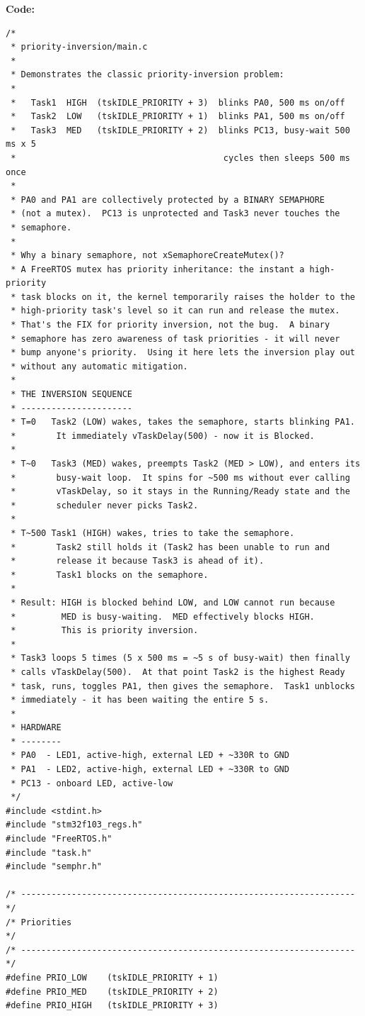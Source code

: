 ﻿\documentclass[12pt,a4paper]{article}
\begin{document}
\textbf{Code:}
\begin{lstlisting}
/*
 * priority-inversion/main.c
 *
 * Demonstrates the classic priority-inversion problem:
 *
 *   Task1  HIGH  (tskIDLE_PRIORITY + 3)  blinks PA0, 500 ms on/off
 *   Task2  LOW   (tskIDLE_PRIORITY + 1)  blinks PA1, 500 ms on/off
 *   Task3  MED   (tskIDLE_PRIORITY + 2)  blinks PC13, busy-wait 500 ms x 5
 *                                         cycles then sleeps 500 ms once
 *
 * PA0 and PA1 are collectively protected by a BINARY SEMAPHORE
 * (not a mutex).  PC13 is unprotected and Task3 never touches the
 * semaphore.
 *
 * Why a binary semaphore, not xSemaphoreCreateMutex()?
 * A FreeRTOS mutex has priority inheritance: the instant a high-priority
 * task blocks on it, the kernel temporarily raises the holder to the
 * high-priority task's level so it can run and release the mutex.
 * That's the FIX for priority inversion, not the bug.  A binary
 * semaphore has zero awareness of task priorities - it will never
 * bump anyone's priority.  Using it here lets the inversion play out
 * without any automatic mitigation.
 *
 * THE INVERSION SEQUENCE
 * ----------------------
 * T=0   Task2 (LOW) wakes, takes the semaphore, starts blinking PA1.
 *        It immediately vTaskDelay(500) - now it is Blocked.
 *
 * T~0   Task3 (MED) wakes, preempts Task2 (MED > LOW), and enters its
 *        busy-wait loop.  It spins for ~500 ms without ever calling
 *        vTaskDelay, so it stays in the Running/Ready state and the
 *        scheduler never picks Task2.
 *
 * T~500 Task1 (HIGH) wakes, tries to take the semaphore.
 *        Task2 still holds it (Task2 has been unable to run and
 *        release it because Task3 is ahead of it).
 *        Task1 blocks on the semaphore.
 *
 * Result: HIGH is blocked behind LOW, and LOW cannot run because
 *         MED is busy-waiting.  MED effectively blocks HIGH.
 *         This is priority inversion.
 *
 * Task3 loops 5 times (5 x 500 ms = ~5 s of busy-wait) then finally
 * calls vTaskDelay(500).  At that point Task2 is the highest Ready
 * task, runs, toggles PA1, then gives the semaphore.  Task1 unblocks
 * immediately - it has been waiting the entire 5 s.
 *
 * HARDWARE
 * --------
 * PA0  - LED1, active-high, external LED + ~330R to GND
 * PA1  - LED2, active-high, external LED + ~330R to GND
 * PC13 - onboard LED, active-low
 */
#include <stdint.h>
#include "stm32f103_regs.h"
#include "FreeRTOS.h"
#include "task.h"
#include "semphr.h"

/* ------------------------------------------------------------------ */
/* Priorities                                                           */
/* ------------------------------------------------------------------ */
#define PRIO_LOW    (tskIDLE_PRIORITY + 1)
#define PRIO_MED    (tskIDLE_PRIORITY + 2)
#define PRIO_HIGH   (tskIDLE_PRIORITY + 3)


\end{lstlisting}
\end{document}
